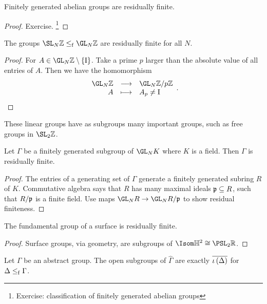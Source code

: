 \begin{proposition}
Finitely generated abelian groups are residually finite.
\end{proposition}

\begin{proof}
Exercise. \footnote{Exercise: classification of finitely generated abelian groups}
\end{proof}

\begin{proposition}
The groups $ \SL_N \ZZ \le_\f \GL_N \ZZ $ are residually finite for all $ N $.
\end{proposition}

\begin{proof}
For $ A \in \GL_N \ZZ \setminus \cbr{\I} $. Take a prime $ p $ larger than the absolute value of all entries of $ A $. Then we have the homomorphism
$$ \function{\GL_N \ZZ}{\GL_N \ZZ / p\ZZ}{A}{A_p \ne \I}. $$
\end{proof}

These linear groups have as subgroups many important groups, such as free groups in $ \SL_2 \ZZ $.

\begin{theorem}
Let $ \Gamma $ be a finitely generated subgroup of $ \GL_N K $ where $ K $ is a field. Then $ \Gamma $ is residually finite.
\end{theorem}

\begin{proof}
The entries of a generating set of $ \Gamma $ generate a finitely generated subring $ R $ of $ K $. Commutative algebra says that $ R $ has many maximal ideals $ \mathfrak{p} \subseteq R $, such that $ R / \mathfrak{p} $ is a finite field. Use maps $ \GL_N R \to \GL_N R / \ppp $ to show residual finiteness.
\end{proof}

\begin{proposition}
The fundamental group of a surface is residually finite.
\end{proposition}

\begin{proof}
Surface groups, via geometry, are subgroups of $ \Isom \HH^2 \cong \PSL_2 \RR $.
\end{proof}

\pagebreak

\begin{lemma}
Let $ \Gamma $ be an abstract group. The open subgroups of $ \widehat{\Gamma} $ are exactly $ \overline{\iota\br{\Delta}} $ for $ \Delta \le_{\mathrm{f}} \Gamma $.
\end{lemma}

